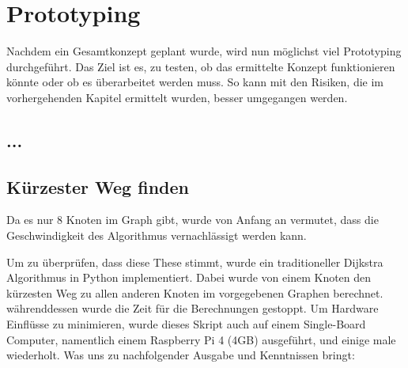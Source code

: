 \section{Prototyping}

Nachdem ein Gesamtkonzept geplant wurde, wird nun möglichst viel Prototyping durchgeführt. Das Ziel ist es, zu testen, ob das ermittelte Konzept funktionieren könnte oder ob es überarbeitet werden muss. So kann mit den Risiken, die im vorhergehenden Kapitel ermittelt wurden, besser umgegangen werden.

\subsection{...}

\subsection{Kürzester Weg finden}

Da es nur 8 Knoten im Graph gibt, wurde von Anfang an vermutet, dass die Geschwindigkeit des Algorithmus vernachlässigt werden kann.

Um zu überprüfen, dass diese These stimmt, wurde ein traditioneller Dijkstra Algorithmus in Python implementiert. Dabei wurde von einem Knoten den kürzesten Weg zu allen anderen Knoten im vorgegebenen Graphen berechnet. währenddessen wurde die Zeit für die Berechnungen gestoppt. Um Hardware Einflüsse zu minimieren, wurde dieses Skript auch auf einem Single-Board Computer, namentlich einem Raspberry Pi 4 (4GB) ausgeführt, und einige male wiederholt. Was uns zu nachfolgender Ausgabe und Kenntnissen bringt:

